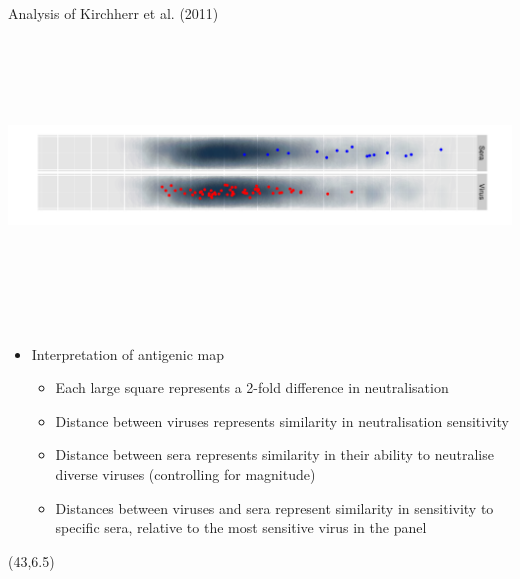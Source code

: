\documentclass[final]{beamer}
\begin{document}
\begin{frame}{}
\begin{textblock}{40}
\begin{block}{Analysis of Kirchherr et al. (2011)}
\includegraphics[height=8cm]{kircherrmap.pdf}
\begin{itemize}
\item{Interpretation of antigenic map}
\begin{itemize}
\item{Each large square represents a 2-fold difference in neutralisation}
\item{Distance between viruses represents similarity in neutralisation sensitivity}
\item{Distance between sera represents similarity in their ability to neutralise diverse viruses (controlling for magnitude)}
\item{Distances between viruses and sera represent similarity in sensitivity to specific sera, relative to the most sensitive virus in the panel}
\end{itemize}
\end{itemize}
\end{block}

\end{textblock}

\begin{textblock}{40}(43,6.5)




\end{textblock}
\end{frame}
\end{document}

